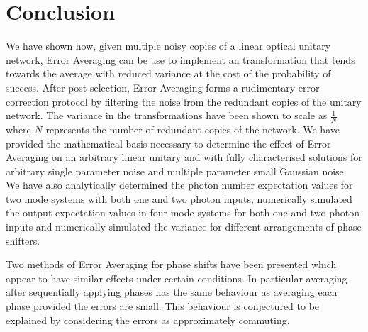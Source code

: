 \documentclass[aps,pra,twocolumn,superscriptaddress,numerical,floatfix]{revtex4-1}
\begin{document}
\section{Conclusion\label{Conclusion}}

We have shown how, given multiple noisy copies of a linear optical unitary network, Error Averaging can be use to implement an transformation that tends towards the average with reduced variance at the cost of the probability of success.  After post-selection, Error Averaging forms a rudimentary error correction protocol by filtering the noise from the redundant copies of the unitary network. The variance in the transformations have been shown to scale as $\frac{1}{N}$ where $N$ represents the number of redundant copies of the network.  We have provided the mathematical basis necessary to determine the effect of Error Averaging on an arbitrary linear unitary and with fully characterised solutions for arbitrary single parameter noise and multiple parameter small Gaussian noise. We have also analytically determined the photon number expectation values for two mode systems with both one and two photon inputs, numerically simulated the output expectation values in four mode systems for both one and two photon inputs and numerically simulated the variance for different arrangements of phase shifters.

Two methods of Error Averaging for phase shifts have been presented which appear to have similar effects under certain conditions. In particular averaging after sequentially applying phases has the same behaviour as averaging each phase provided the errors are small. This behaviour is conjectured to be explained by considering the errors as approximately commuting.


\end{document}
